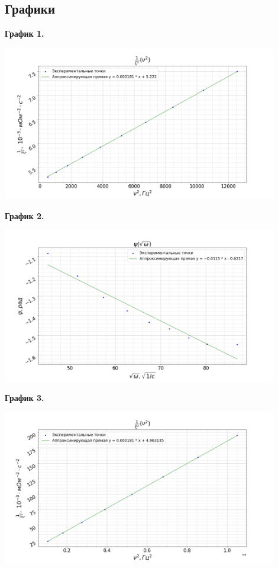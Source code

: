 \documentclass[15pt,a5paper,reqno]{article}
\begin{document}
    \newpage
    \subsection{Графики}

    \noindent\hypertarget{graph_1}{\textbf{График 1.}}
    \begin{center}
        \includegraphics[width = 0.9\textwidth]{images/graph_1.png}
    \end{center}

    \noindent\hypertarget{graph_2}{\textbf{График 2.}}
    \begin{center}
        \includegraphics[width = 0.9\textwidth]{images/graph_2.png}
    \end{center}

    \noindent\hypertarget{graph_3}{\textbf{График 3.}}
    \begin{center}
        \includegraphics[width = 0.9\textwidth]{images/graph_3.png}
    \end{center}
\end{document}
